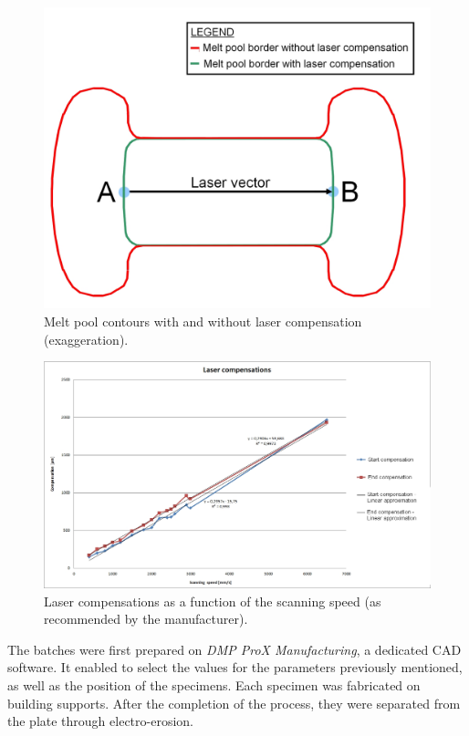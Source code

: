 \begin{figure}[ht]
\centering
\includegraphics[scale=0.3]{Images/Compens}
\decoRule
\caption[Melt pool contours with and without laser compensation (exaggeration)]{Melt pool contours with and without laser compensation (exaggeration).}
\label{fig:Compens}
\end{figure}

\begin{figure}[ht]
\centering
\includegraphics[scale=0.45]{Images/Compens1}
\decoRule
\caption[Laser compensations as a function of the scanning speed (as recommended by the manufacturer)]{Laser compensations as a function of the scanning speed (as recommended by the manufacturer).}
\label{fig:Compens1}
\end{figure}

The batches were first prepared on \textit{DMP ProX Manufacturing}, a dedicated CAD software. It enabled to select the values for the parameters previously mentioned, as well as the position of the specimens. Each specimen was fabricated on building supports. After the completion of the process, they were separated from the plate through electro-erosion. \\


